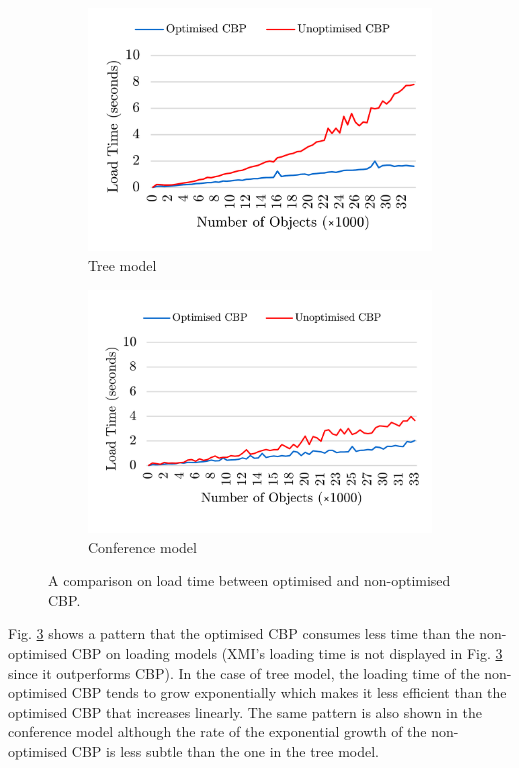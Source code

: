 \documentclass{llncs}
\begin{document}
\begin{figure}[ht]	
	\begin{subfigure}[t]{0.5\linewidth}
		\includegraphics[width=\linewidth]{loading_speed_tree}
		\caption{Tree model}\label{fig:append_speed_tree}		
	\end{subfigure}
	\hfill
	\begin{subfigure}[t]{0.5\linewidth}
		\includegraphics[width=\linewidth]{loading_speed_conf}
		\caption{Conference model}\label{fig:append_speed_conference}
	\end{subfigure}
	\caption{A comparison on load time between optimised and non-optimised CBP.}
	\label{fig:loading_speed}
\end{figure}

Fig. \ref{fig:loading_speed} shows a pattern that the optimised CBP consumes less time than the non-optimised CBP on loading models (XMI's loading time is not displayed in Fig. \ref{fig:loading_speed} since it outperforms CBP). In the case of tree model, the loading time of the non-optimised CBP tends to grow exponentially which makes it less efficient than the optimised CBP that increases linearly. The same pattern is also shown in the conference model although the rate of the exponential growth of the non-optimised CBP is less subtle than the one in the tree model. 
\end{document}

